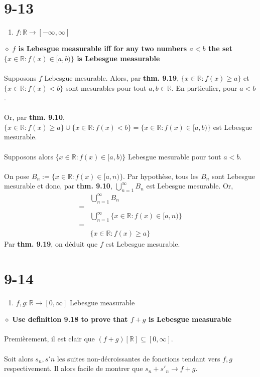 \documentclass[a4paper,10pt]{article}
\begin{document}
\section*{9-13}
\begin{enumerate}
	\item $f : \mathbb{R} \rightarrow [-\infty, \infty]$
\end{enumerate}
$\diamond$ \textbf{$f$ is Lebesgue measurable iff for any two numbers $a < b$ the set $\{x \in \mathbb{R} : f(x) \in [a,b) \}$ is Lebesgue measurable}
\\
\\
Supposons $f$ Lebesgue mesurable. Alors, par \textbf{thm. 9.19}, $\{x \in \mathbb{R} : f(x) \geq a \}$ et $\{x \in \mathbb{R} : f(x) < b\}$ sont mesurables pour tout $a,b \in \mathbb{R}$. En particulier, pour $a < b$. 
\\
\\
Or, par \textbf{thm. 9.10}, $\{x \in \mathbb{R} : f(x) \geq a \} \cup \{x \in \mathbb{R} : f(x) < b\} = \{x \in \mathbb{R} : f(x) \in [a,b)\}$ est Lebesgue mesurable.
\\
\\
Supposons alors $\{x \in \mathbb{R} : f(x) \in [a, b) \}$ Lebesgue mesurable pour tout $a < b$.
\\
\\
On pose $B_n := \{x \in \mathbb{R} : f(x) \in [a, n) \}$. Par hypothèse, tous les $B_n$ sont Lebesgue mesurable et donc, par \textbf{thm. 9.10}, $\displaystyle \bigcup_{n=1}^\infty B_n$ est Lebesgue mesurable. Or, 
\begin{align*}
	& \bigcup_{n=1}^\infty B_n \\
	= \\
	& \bigcup_{n=1}^\infty \{x \in \mathbb{R} : f(x) \in [a, n) \} \\
	= \\
	& \{x \in \mathbb{R} : f(x) \geq a\}
\end{align*}
Par \textbf{thm. 9.19}, on déduit que $f$ est Lebesgue mesurable.

\section*{9-14}
\begin{enumerate}
	\item $f,g : \mathbb{R} \rightarrow [0, \infty]$ Lebesgue measurable
\end{enumerate}
$\diamond$ \textbf{Use definition 9.18 to prove that $f + g$ is Lebesgue measurable}
\\
\\
Premièrement, il est clair que $(f + g) [ \mathbb{R} ] \subseteq [0, \infty]$. 
\\
\\
Soit alors $s_n, s'n$ les suites non-décroissantes de fonctions tendant vers $f,g$ respectivement. Il alors facile de montrer que $s_n + s'_n \rightarrow f + g$.
\end{document}
